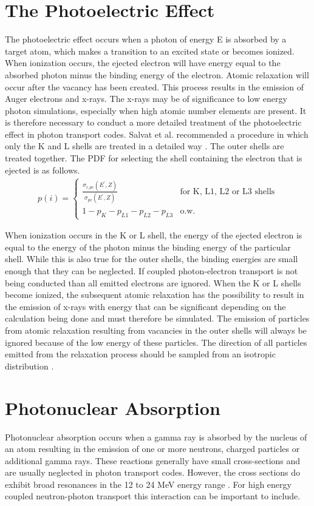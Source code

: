 \section{The Photoelectric Effect}
The photoelectric effect occurs when a photon of energy E is absorbed by a
target atom, which makes a transition to an excited state or becomes ionized.
When ionization occurs, the ejected electron will have energy equal to the 
absorbed photon minus the binding energy of the electron. Atomic relaxation
will occur after the vacancy has been created. This process results in the 
emission of Auger electrons and x-rays. The x-rays may be of significance to
low energy photon simulations, especially when high atomic number elements are
present. It is therefore necessary to conduct a more detailed treatment of the
photoelectric effect in photon transport codes. Salvat et al. recommended a 
procedure in which only the K and L shells are treated in a detailed way
\citep{salvat_physics_2001}. The outer shells are treated together. The PDF
for selecting the shell containing the electron that is ejected is as follows.
\begin{align}
  p(i) = 
  \begin{cases}
    \frac{\sigma_{i,pe}(E^{'},Z)}{\sigma_{pe}(E^{'},Z)} & \text{for K, L1, L2 or L3 shells} \\
    1 - p_K - p_{L1} - p_{L2} - p_{L3} & \text{o.w.}
  \end{cases}
\end{align}

When ionization occurs in the K or L shell, the energy of the ejected electron
is equal to the energy of the photon minus the binding energy of the particular
shell. While this is also true for the outer shells, the binding energies are
small enough that they can be neglected. If coupled photon-electron transport
is not being conducted than all emitted electrons are ignored. When the K or
L shells become ionized, the subsequent atomic relaxation has the possibility
to result in the emission of x-rays with energy that can be significant
depending on the calculation being done and must therefore be simulated. The
emission of particles from atomic relaxation resulting from vacancies in the
outer shells will always be ignored because of the low energy of these 
particles. The direction of all particles emitted from the relaxation process
should be sampled from an isotropic distribution \citep{salvat_physics_2001}.

\section{Photonuclear Absorption}
Photonuclear absorption occurs when a gamma ray is absorbed by the nucleus of
an atom resulting in the emission of one or more neutrons, charged particles or
additional gamma rays. These reactions generally have small cross-sections
and are usually neglected in photon transport codes. However, the cross sections
do exhibit broad resonances in the 12 to 24 MeV energy range 
\citep{lux_monte_1991}. For high energy coupled neutron-photon transport this
interaction can be important to include. 

